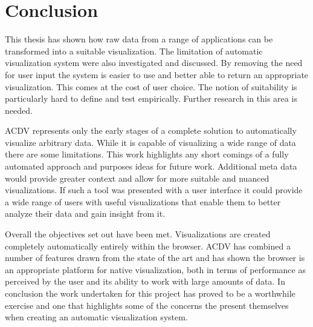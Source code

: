 \documentclass[a4paper, 11pt, titlepage, onehalfspacing]{report}
\begin{document}
\section{Conclusion}
This thesis has shown how raw data from a range of applications can be transformed into a suitable visualization. The limitation of automatic visualization system were also investigated and discussed. By removing the need for user input the system is easier to use and better able to return an appropriate visualization. This comes at the cost of user choice. The notion of suitability is particularly hard to define and test empirically. Further research in this area is needed.

AC\lightning{}DV represents only the early stages of a complete solution to automatically visualize arbitrary data. While it is capable of visualizing a wide range of data there are some limitations. This work highlights any short comings of a fully automated approach and purposes ideas for future work. Additional meta data would provide greater context and allow for more suitable and nuanced visualizations. If such a tool was presented with a user interface it could provide a wide range of users with useful visualizations that enable them to better analyze their data and gain insight from it.

Overall the objectives set out have been met. Visualizations are created completely automatically entirely within the browser. AC\lightning{}DV has combined a number of features drawn from the state of the art and has shown the browser is an appropriate platform for native visualization, both in terms of performance as perceived by the user and its ability to work with large amounts of data. In conclusion the work undertaken for this project has proved to be a worthwhile exercise and one that highlights some of the concerns the present themselves when creating an automatic visualization system.







\end{document}
